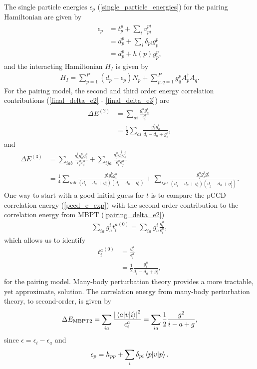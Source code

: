 \documentclass[Dual]{msu-thesis}
\begin{document}
The single particle energies $\epsilon_p$ (\ref{single_particle_energies}) for the pairing Hamiltonian are given by
\begin{align}
\epsilon_p 
&=
t^p_p+\sum_iv^{pi}_{pi}
\\
&=
d^p_p
+
\sum_{i}\delta_{pi}g^p_p
\\
&=
d^p_p
+
h(p)g^p_p
,\end{align}
and the interacting Hamiltonian $H_I$ is given by
\begin{align}
H_I
=
\sum_{p=1}^P(d_p-\epsilon_p)N_p+\sum_{p,q=1}^Pg^p_qA^\dagger_p A_q.
\end{align}
For the pairing model, the second and third order energy correlation contributions (\ref{final_delta_e2} - \ref{final_delta_e3}) are
\begin{align}
\label{pairing_delta_e2}
\Delta E^{(2)}
&=
\sum_{ai}\frac{g^a_ig^i_a}{\epsilon^{a}_{i}}
\nonumber
\\
&=
\frac{1}{2}\sum_{ai}\frac{g^a_ig^i_a}{d_i-d_a+g^i_i}
,\end{align}
and
\begin{align}
\label{pairing_delta_e3}
\Delta E^{(3)}
&=
\sum_{iab}
\frac{g^{i}_{b}g^{b}_{a}g^{a}_{i}}{\epsilon^{a}_{i}\epsilon^{b}_{i}}
+
\sum_{ija}
\frac{g^{a}_{j}g^{j}_{i}g^{i}_{a}}{\epsilon^{a}_{i}\epsilon^{a}_{j}}
\nonumber
\\
&=
\frac{1}{4}\sum_{iab}
\frac{g^{i}_{b}g^{b}_{a}g^{a}_{i}}{\left(d_i-d_a+g^i_i\right)\left(d_i-d_b+g^i_i\right)}
+
\sum_{ija}
\frac{g^{a}_{j}g^{j}_{i}g^{i}_{a}}{\left(d_i-d_a+g^i_i\right)\left(d_j-d_a+g^j_j\right)}
.\end{align}
One way to start with a good initial guess for $t$ is to compare the pCCD correlation energy (\ref{pccd_e_exp}) with the second order contribution to the correlation energy from MBPT (\ref{pairing_delta_e2})
\begin{align}
\sum_{ia}g^i_a{t^a_i}^{(0)}=\sum_{ia}g^i_a\frac{g^a_i}{\epsilon^{a}_{i}}
,\end{align}
which allows us to identify
\begin{align}
\label{t_init}
{t^a_i}^{(0)}
&=
\frac{g^a_i}{\epsilon^{a}_{i}}
\nonumber
\\
&=
\frac{1}{2}\frac{g^a_i}{d_i-d_a+g^i_i}
,\end{align}
for the pairing model. Many-body perturbation theory provides a more tractable, yet approximate, solution. The correlation energy from many-body perturbation theory, to second-order, is given by
\begin{align}
\Delta E_{\text{MBPT}2}
=
\sum_{ia}\frac{\abs{\mel{a}{v}{i}}^2}{\epsilon^a_i}
=\sum_{ia}\frac{1}{2}\frac{g^2}{i-a+g}
,\end{align}
since $\epsilon= \epsilon_i-\epsilon_a$ and
\begin{align}
\epsilon_p= h_{pp}+\sum_i\delta_{pi}\mel{p}{v}{p}
.\end{align}
\end{document}
